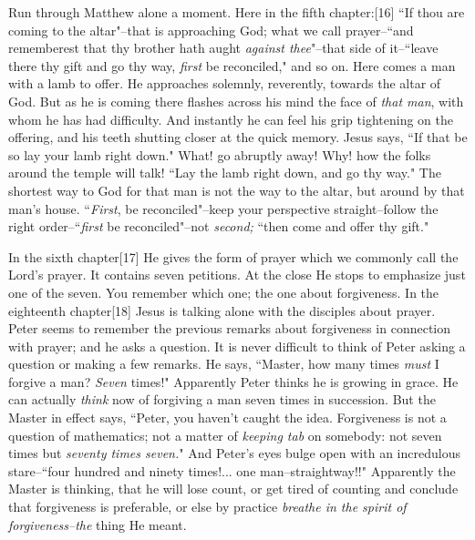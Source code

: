 Run through Matthew alone a moment. Here in the fifth chapter:[16] ``If
thou are coming to the altar"--that is approaching God; what we call
prayer--``and rememberest that thy brother hath aught \textit{against thee}"--that
side of it--``leave there thy gift and go thy way, \textit{first} be reconciled,"
and so on. Here comes a man with a lamb to offer. He approaches solemnly,
reverently, towards the altar of God. But as he is coming there flashes
across his mind the face of \textit{that man}, with whom he has had difficulty.
And instantly he can feel his grip tightening on the offering, and his
teeth shutting closer at the quick memory. Jesus says, ``If that be so lay
your lamb right down." What! go abruptly away! Why! how the folks around
the temple will talk! ``Lay the lamb right down, and go thy way." The
shortest way to God for that man is not the way to the altar, but around
by that man's house. ``\textit{First}, be reconciled"--keep your perspective
straight--follow the right order--``\textit{first} be reconciled"--not \textit{second;}
``then come and offer thy gift."

In the sixth chapter[17] He gives the form of prayer which we commonly
call the Lord's prayer. It contains seven petitions. At the close He
stops to emphasize just one of the seven. You remember which one; the one
about forgiveness. In the eighteenth chapter[18] Jesus is talking alone
with the disciples about prayer. Peter seems to remember the previous
remarks about forgiveness in connection with prayer; and he asks a
question. It is never difficult to think of Peter asking a question or
making a few remarks. He says, ``Master, how many times \textit{must} I forgive a
man? \textit{Seven} times!" Apparently Peter thinks he is growing in grace. He
can actually \textit{think} now of forgiving a man seven times in succession. But
the Master in effect says, ``Peter, you haven't caught the idea.
Forgiveness is not a question of mathematics; not a matter of \textit{keeping
tab} on somebody: not seven times but \textit{seventy times seven.}" And Peter's
eyes bulge open with an incredulous stare--``four hundred and ninety
times!... one man--straightway!!" Apparently the Master is thinking, that
he will lose count, or get tired of counting and conclude that forgiveness
is preferable, or else by practice \textit{breathe in the spirit of
forgiveness--the} thing He meant.

